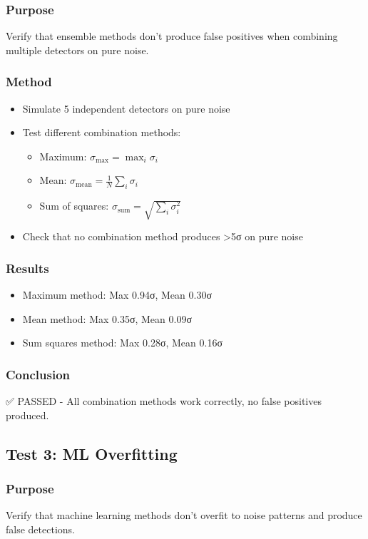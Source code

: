 \subsubsection{Purpose}
Verify that ensemble methods don't produce false positives when combining multiple detectors on pure noise.

\subsubsection{Method}
\begin{itemize}
    \item Simulate 5 independent detectors on pure noise
    \item Test different combination methods:
    \begin{itemize}
        \item Maximum: $\sigma_{\text{max}} = \max_i \sigma_i$
        \item Mean: $\sigma_{\text{mean}} = \frac{1}{N} \sum_i \sigma_i$
        \item Sum of squares: $\sigma_{\text{sum}} = \sqrt{\sum_i \sigma_i^2}$
    \end{itemize}
    \item Check that no combination method produces >5σ on pure noise
\end{itemize}

\subsubsection{Results}
\begin{itemize}
    \item Maximum method: Max 0.94σ, Mean 0.30σ
    \item Mean method: Max 0.35σ, Mean 0.09σ
    \item Sum squares method: Max 0.28σ, Mean 0.16σ
\end{itemize}

\subsubsection{Conclusion}
✅ PASSED - All combination methods work correctly, no false positives produced.

\subsection{Test 3: ML Overfitting}

\subsubsection{Purpose}
Verify that machine learning methods don't overfit to noise patterns and produce false detections.

